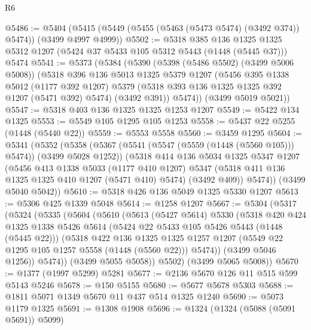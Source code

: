 \begin{lexlean}{R6}
\begin{coremodule}
@5486 := @5404 (@5415 (@5449 (@5455 (@5463 (@5473 @5474) (@3492 @374)) @5474)) (@3499 @4997 @4999))
@5502 := @5318
    @385
    @136
    @1325
    @1325
    @5312
    @1207
    (@5424 @37 @5433 @105 @5312 @5443 (@1448 (@5445 @37)))
    @5474
@5541 := @5373
    (@5384
      (@5390
        (@5398 (@5486 @5502) (@3499 @5006 @5008))
        (@5318
          @396
          @136
          @5013
          @1325
          @5379
          @1207
          (@5456
            @395
            @1338
            @5012
            (@1177 @392 @1207)
            @5379
            (@5318 @393 @136 @1325 @1325 @392 @1207 (@5471 @392) @5474)
            (@3492 @391))
          @5474))
      (@3499 @5019 @5021))
@5547 := @5318 @403 @136 @1325 @1325 @1253 @1207
@5549 := @5422 @134 @1325
@5553 := @5549 @105 @1295 @105 @1253
@5558 := @5437 @22 @5255 (@1448 (@5440 @22))
@5559 := @5553 @5558
@5560 := @3459 @1295
@5604 := @5341
    (@5352
      (@5358
        (@5367 (@5541 (@5547 (@5559 (@1448 (@5560 @105))) @5474)) (@3499 @5028 @1252))
        (@5318
          @414
          @136
          @5034
          @1325
          @5347
          @1207
          (@5456
            @413
            @1338
            @5033
            (@1177 @410 @1207)
            @5347
            (@5318 @411 @136 @1325 @1325 @410 @1207 (@5471 @410) @5474)
            (@3492 @409))
          @5474))
      (@3499 @5040 @5042))
@5610 := @5318 @426 @136 @5049 @1325 @5330 @1207
@5613 := @5306 @425 @1339 @5048
@5614 := @1258 @1207
@5667 := @5304
    (@5317
      (@5324
        (@5335
          (@5604
            (@5610
              (@5613
                (@5427 @5614)
                @5330
                (@5318
                  @420
                  @424
                  @1325
                  @1338
                  @5426
                  @5614
                  (@5424 @22 @5433 @105 @5426 @5443 (@1448 (@5445 @22)))
                  (@5318
                    @422
                    @136
                    @1325
                    @1325
                    @1257
                    @1207
                    (@5549 @22 @1295 @105 @1257 @5558 (@1448 (@5560 @22)))
                    @5474))
                (@3499 @5046 @1256))
              @5474))
          (@3499 @5055 @5058))
        @5502)
      (@3499 @5065 @5008))
@5670 := @1377 (@1997 @5299) @5281
@5677 := @2136 @5670 @126 @11 @515 @599 @5143 @5246
@5678 := @150 @5155
@5680 := @5677 @5678 @5303
@5688 := @1811 @5071 @1349 @5670 @11 @437 @514 @1325 @1240
@5690 := @5073 @1179 @1325
@5691 := @1308 @1908
@5696 := @1324 (@1324 (@5088 (@5091 @5691)) @5099)

\end{coremodule}
\end{lexlean}
